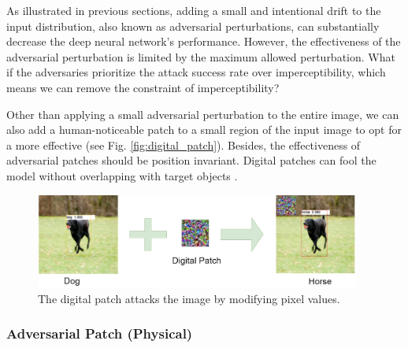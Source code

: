 As illustrated in previous sections, adding a small and intentional drift to the input distribution, also known as adversarial perturbations, can substantially decrease the deep neural network's performance. However, the effectiveness of the adversarial perturbation is limited by the maximum allowed perturbation. What if the adversaries prioritize the attack success rate over imperceptibility, which means we can remove the constraint of imperceptibility?

Other than applying a small adversarial perturbation to the entire image, we can also add a human-noticeable patch to a small region of the input image to opt for a more effective (see Fig. \ref{fig:digital_patch}). Besides, the effectiveness of adversarial patches should be position invariant. Digital patches can fool the model without overlapping with target objects \citep{saha2019adversarial}.


\begin{figure}[H]
\centering
\includegraphics[width=0.95\textwidth]{figures/chapter_intro/digital_patch.jpg}
\caption{The digital patch attacks the image by modifying pixel values.}
\label{fig.digital_patch}
\end{figure}






\subsubsection{Adversarial Patch (Physical)}

